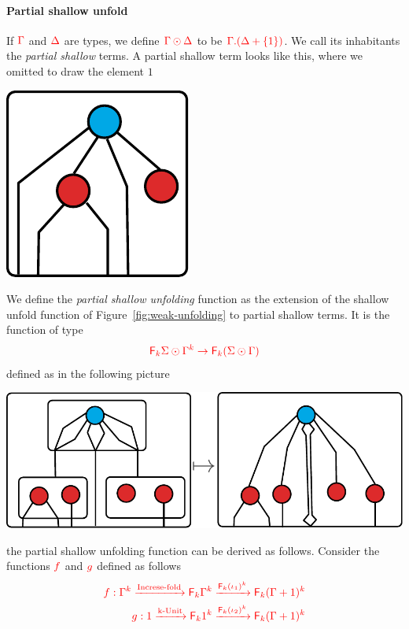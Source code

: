 \paragraph*{Partial shallow unfold}
 If ${\color{red}{\Gamma}}$ and ${\color{red}{\Delta}}$ are types, we define ${\color{red}{\Gamma\odot\Delta}}$ to be ${\color{red}{\Gamma.(\Delta+\{1\})}}$. We call its inhabitants the \emph{partial shallow} terms. A partial shallow term looks like this, where we omitted to draw the element $1$ 
\begin{center}
\includegraphics[scale=.4]{pictures/partial-shallow-term.pdf}
\end{center}
We define the \emph{partial shallow unfolding} function as the extension  of the shallow unfold function of Figure~\ref{fig:weak-unfolding} to partial shallow terms. It is the function of type 
\begin{align*}
{\color{red}{{{\color{red}{\mathsf F_{k}}}\Sigma}\odot{\Gamma^k} \to {\color{red}{\mathsf F_{k}}}({\Sigma}\odot{\Gamma})}} 
\end{align*}
defined as in the following picture
 \begin{center}
\includegraphics[scale=.4]{pictures/partial-shallow-unfold.pdf}
 \end{center}
the partial shallow unfolding function can be derived as follows. Consider the functions ${\color{red}{f}}$ and ${\color{red}{g}}$ defined as follows
\begin{align*}
{\color{red}{f:\Gamma^k \xrightarrow{\text{Increse-fold}} {\color{red}{\mathsf F_{k}}}\Gamma^k \xrightarrow{{\color{red}{\mathsf F_{k}}}(\iota_1)^k} {\color{red}{\mathsf F_{k}}}(\Gamma+1)^k}}  \\ 
{\color{red}{g:1 \xrightarrow{\text{k-Unit}} {\color{red}{\mathsf F_{k}}}1^k \xrightarrow{{\color{red}{\mathsf F_{k}}}(\iota_2)^k} {\color{red}{\mathsf F_{k}}}(\Gamma+1)^k }}
\end{align*}
